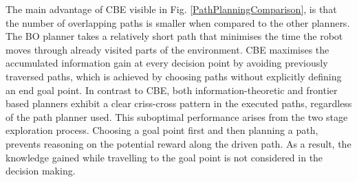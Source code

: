 \documentclass[shortAfour,sageh,times]{sagej_no_sage}
\begin{document}
The main advantage of CBE visible in Fig. \ref{PathPlanningComparison}, is that the number of overlapping paths is smaller when compared to the other planners. The BO planner takes a relatively short path that minimises the time the robot moves through already visited parts of the environment. CBE maximises the accumulated information gain at every decision point by avoiding previously traversed paths, which is achieved by choosing paths without explicitly defining an end goal point. In contrast to CBE, both information-theoretic and frontier based planners exhibit a clear criss-cross pattern in the executed paths, regardless of the path planner used. This suboptimal performance arises from the two stage exploration process. Choosing a goal point first and then planning a path, prevents reasoning on the potential reward along the driven path. As a result, the knowledge gained while travelling to the goal point is not considered in the decision making.
\end{document}
